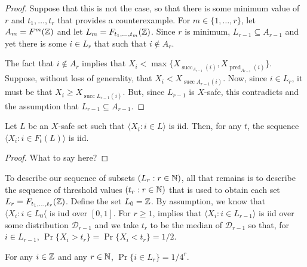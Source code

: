 \documentclass{patmorin}
\DeclareMathOperator{\cw}{succ}
\DeclareMathOperator{\ccw}{pred}
\begin{document}
\begin{proof}
   Suppose that this is not the case, so that there is some
   minimum value of $r$ and $t_1,\ldots,t_r$ that provides a
   counterexample.  For $m\in\{1,\ldots,r\}$, let $A_m=F^{m}(\mathbb{Z})$ and let
   $L_m=F_{t_1,\ldots,t_m}(\mathbb{Z})$.  Since $r$ is minimum, $L_{r-1}\subseteq
   A_{r-1}$ and yet there is some $i\in L_r$ that such that $i\not\in
   A_r$.

   The fact that $i\not\in A_r$ implies that $X_i
   < \max\{X_{\cw_{A_{r-1}}(i)},X_{\ccw_{A_{r-1}}(i)}\}$.
   Suppose, without loss of generality, that $X_i < X_{\cw{A_{r-1}}(i)}$.
   Now, since $i\in L_r$, it must be that $X_i
   \ge X_{\cw{L_{r-1}}(i)}$.  But, since $L_{r-1}$ is
   $X$-safe, this contradicts  and the assumption that
   $L_{r-1}\subseteq A_{r-1}$.
\end{proof}

\begin{lem}
   Let $L$ be an $X$-safe set such that $\langle X_i:i\in L\rangle$ is iid.  Then, for any $t$, the sequence $\langle X_i: i\in F_t(L)\rangle$ is iid.
\end{lem}

\begin{proof}
   What to say here?
\end{proof}

To describe our sequence of subsets $(L_r: r\in\mathbb{N})$, all that remains
is to describe the sequence of threshold values $(t_r:r\in\mathbb{N})$ that is
used to obtain each set $L_r = F_{t_1,\ldots,t_r}(\mathbb{Z})$.  Define the
set $L_0=\mathbb{Z}$.  By assumption, we know that $\langle X_i:i\in L_0\langle$ is iud
over $[0,1]$.  For $r\ge 1$,  implies that $\langle X_i:i\in
L_{r-1}\rangle$ is iid over some distribution $\mathcal{D}_{r-1}$ and we take
$t_r$ to be the median of $\mathcal{D}_{r-1}$ so that, for $i\in L_{r-1}$,
$\Pr\{X_i > t_r\}=\Pr\{X_i < t_r\} = 1/2$.

\begin{lem}
   For any $i\in\mathbb{Z}$ and any $r\in\mathbb{N}$, $\Pr\{i\in L_r\} = 1/4^r$.
\end{lem}
\end{document}
